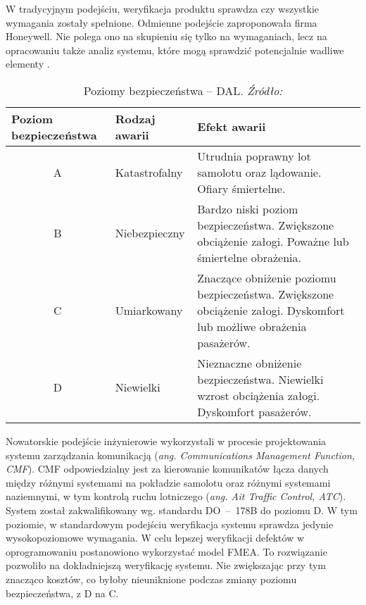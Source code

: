 \documentclass[a4paper, 12pt, twoside]{article}
\begin{document}
W tradycyjnym podejściu, weryfikacja produktu sprawdza czy wszystkie wymagania zostały spełnione. Odmienne podejście zaproponowała firma Honeywell. Nie polega ono na skupieniu się tylko na wymaganiach, lecz na opracowaniu także analiz systemu, które mogą sprawdzić potencjalnie wadliwe elementy \cite{honeywellFMEA}. 
\begin{table}[ht!]
\centering
\begin{tabular}{ | m{} | m{3cm} | m{6cm} |}
\hline
    \textbf{Poziom bezpieczeństwa} & \textbf{Rodzaj awarii} & \textbf{Efekt awarii} \\ 
\hline
    \multicolumn{1}{|c|}{A} & Katastrofalny & Utrudnia poprawny lot samolotu oraz lądowanie. Ofiary śmiertelne.\\
\hline
    \multicolumn{1}{|c|}{B} & Niebezpieczny & Bardzo niski poziom bezpieczeństwa. Zwiększone obciążenie załogi. Poważne lub śmiertelne obrażenia.\\
\hline
    \multicolumn{1}{|c|}{C} & Umiarkowany & Znaczące obniżenie poziomu bezpieczeństwa. Zwiększone obciążenie załogi. Dyskomfort lub możliwe obrażenia pasażerów.\\
\hline
    \multicolumn{1}{|c|}{D} & Niewielki & Nieznaczne obniżenie bezpieczeństwa. Niewielki wzrost obciążenia załogi. Dyskomfort pasażerów. \\
\hline
\end{tabular}
\caption{Poziomy bezpieczeństwa -- DAL. \textit{ Źródło: \cite{honeywellFMEA}} }
\label{tab-dal}
\end{table}
Nowatorskie podejście inżynierowie wykorzystali w procesie projektowania systemu zarządzania komunikacją  (\textit{ang. Communications Management Function, CMF}). CMF odpowiedzialny jest za kierowanie komunikatów łącza danych między różnymi systemami na pokładzie samolotu oraz różnymi systemami naziemnymi, w tym kontrolą ruchu lotniczego (\textit{ang. Ait Traffic Control, ATC}). System został zakwalifikowany wg. standardu DO~--~178B do poziomu D. W tym poziomie, w standardowym podejściu weryfikacja systemu sprawdza jedynie wysokopoziomowe wymagania. W celu lepszej weryfikacji defektów w oprogramowaniu postanowiono wykorzystać model FMEA. To rozwiązanie pozwoliło na dokładniejszą weryfikację systemu. Nie zwiększając przy tym znacząco kosztów, co byłoby nieuniknione podczas zmiany poziomu bezpieczeństwa, z D na C.
\end{document}
